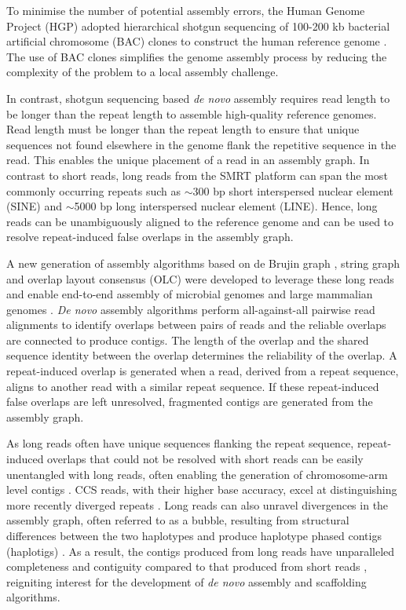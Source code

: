 To minimise the number of potential assembly errors, the Human Genome Project (HGP) adopted hierarchical shotgun sequencing of 100-200 kb bacterial artificial chromosome (BAC) clones to construct the human reference genome \cite{Lander2001-du}. The use of BAC clones simplifies the genome assembly process by reducing the complexity of the problem to a local assembly challenge.

In contrast, shotgun sequencing based \textit{de novo} assembly requires read length to be longer than the repeat length to assemble high-quality reference genomes. Read length must be longer than the repeat length to ensure that unique sequences not found elsewhere in the genome flank the repetitive sequence in the read. This enables the unique placement of a read in an assembly graph. In contrast to short reads, long reads from the SMRT platform can span the most commonly occurring repeats such as $\sim$300 bp short interspersed nuclear element (SINE) and $\sim$5000 bp long interspersed nuclear element (LINE). Hence, long reads can be unambiguously aligned to the reference genome and can be used to resolve repeat-induced false overlaps in the assembly graph. 

A new generation of assembly algorithms based on de Brujin graph \cite{Lin2016-vl}, string graph \cite{Myers2005-ei, Chin2016-at} and overlap layout consensus (OLC) \cite{Koren2017-cq} were developed to leverage these long reads and enable end-to-end assembly of microbial genomes\cite{Chin2013-hp, Bashir2012-cs} and large mammalian genomes \cite{Chin2016-at, Koren2017-cq}. \textit{De novo} assembly algorithms perform all-against-all pairwise read alignments to identify overlaps between pairs of reads and the reliable overlaps are connected to produce contigs. The length of the overlap and the shared sequence identity between the overlap determines the reliability of the overlap. A repeat-induced overlap is generated when a read, derived from a repeat sequence, aligns to another read with a similar repeat sequence. If these repeat-induced false overlaps are left unresolved, fragmented contigs are generated from the assembly graph. 

As long reads often have unique sequences flanking the repeat sequence, repeat-induced overlaps that could not be resolved with short reads can be easily unentangled with long reads, often enabling the generation of chromosome-arm level contigs \cite{Nurk2020-gu, Cheng2021-ij}. CCS reads, with their higher base accuracy, excel at distinguishing more recently diverged repeats \cite{Nurk2022-dv}. Long reads can also unravel divergences in the assembly graph, often referred to as a bubble, resulting from structural differences between the two haplotypes and produce haplotype phased contigs (haplotigs) \cite{Chin2016-at}. As a result, the contigs produced from long reads have unparalleled completeness and contiguity compared to that produced from short reads \cite{Gordon2016-ho}, reigniting interest for the development of \textit{de novo} assembly and scaffolding algorithms.  

